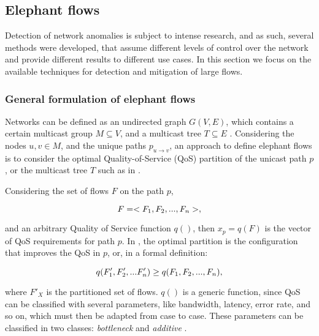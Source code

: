 \subsection {Elephant flows}

Detection of network anomalies is subject to intense research, and as such, several methods were developed, that assume different levels of control over the network 
and provide different results to different use cases. In this section we focus on the available techniques for detection and mitigation of large flows.

\subsubsection{General formulation of elephant flows}

Networks can be defined as an undirected graph $G(V, E)$, which contains a certain multicast group $M \subseteq V$, and a multicast tree $T \subseteq E$ 
\cite{CITE - optimal_partiotion_many_many_connections}. Considering the nodes $u, v \in M$, and the unique paths $p_{u \to v}$, an approach to define elephant flows
is to consider the optimal Quality-of-Service (QoS) partition of the unicast path $p$, or the multicast tree $T$ such as in 
\cite{CITE - optimal_partiotion_many_many_connections, Optimal_partition_of_QoS_requirements_on_unicast_p}. 

\par Considering the set of flows $F$ on the path $p$,

\begin{equation*}
    \centering
    F = <F_1, F_2, ..., F_n>,
\end{equation*}

\par and an arbitrary Quality of Service function $q()$, then $x_p = q(F)$ is the vector of QoS requirements 
for path $p$. In \cite{mathematical_framework_elph_flow_detec}, the optimal partition is the configuration that improves the QoS in $p$, or, in a formal
definition:

\begin{equation*}
    \centering
    q(F'_1, F'_2, ... F'_n) \geq q(F_1, F_2, ..., F_n),
\end{equation*}

\par where $F'_{X}$ is the partitioned set of flows. $q()$ is a generic function, since QoS can be classified with several parameters, like bandwidth, latency,
error rate, and so on, which must then be adapted from case to case. These parameters can be classified in two classes: \textit{bottleneck} and \textit{additive} 
\cite{CITE - Optimal_partition_of_QoS_requirements_on_unicast_p}.

